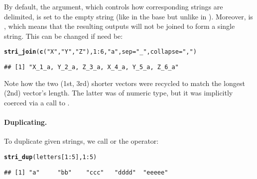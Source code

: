 \documentclass[nojss]{jss}\usepackage[]{graphicx}\usepackage[]{xcolor}
\makeatletter
\newcommand{\hlnum}[1]{\textcolor[rgb]{0.686,0.059,0.569}{#1}}%
\newcommand{\hlstr}[1]{\textcolor[rgb]{0.192,0.494,0.8}{#1}}%
\newcommand{\hlopt}[1]{\textcolor[rgb]{0,0,0}{#1}}%
\newcommand{\hlstd}[1]{\textcolor[rgb]{0.345,0.345,0.345}{#1}}%
\newcommand{\hlkwc}[1]{\textcolor[rgb]{0.333,0.667,0.333}{#1}}%
\newcommand{\hlkwd}[1]{\textcolor[rgb]{0.737,0.353,0.396}{\textbf{#1}}}%
\newenvironment{kframe}{%
 \def\at@end@of@kframe{}%
 \ifinner\ifhmode%
  \def\at@end@of@kframe{\end{minipage}}%
  \begin{minipage}{\columnwidth}%
 \fi\fi%
 \def\FrameCommand##1{\hskip\@totalleftmargin \hskip-\fboxsep
 \colorbox{shadecolor}{##1}\hskip-\fboxsep
     \hskip-\linewidth \hskip-\@totalleftmargin \hskip\columnwidth}%
 \MakeFramed {\advance\hsize-\width
   \@totalleftmargin\z@ \linewidth\hsize
   \@setminipage}}%
 {\par\unskip\endMakeFramed%
 \at@end@of@kframe}
\newenvironment{knitrout}{}{} %
\makeatother
\begin{document}
By default, the  argument, which controls how corresponding
strings are delimited, is set to the empty string
(like in the base  but unlike in ).
Moreover,  is , which means that
the resulting outputs will not be joined to form a single string.
This can be changed if need be:

\begin{knitrout}
\color{fgcolor}\begin{kframe}
\begin{alltt}
\hlkwd{stri_join}\hlstd{(}\hlkwd{c}\hlstd{(}\hlstr{"X"}\hlstd{,} \hlstr{"Y"}\hlstd{,} \hlstr{"Z"}\hlstd{),} \hlnum{1}\hlopt{:}\hlnum{6}\hlstd{,} \hlstr{"a"}\hlstd{,} \hlkwc{sep}\hlstd{=}\hlstr{"_"}\hlstd{,} \hlkwc{collapse}\hlstd{=}\hlstr{", "}\hlstd{)}
\end{alltt}
\begin{verbatim}
## [1] "X_1_a, Y_2_a, Z_3_a, X_4_a, Y_5_a, Z_6_a"
\end{verbatim}
\end{kframe}
\end{knitrout}



\noindent
Note how the two (1st, 3rd) shorter vectors were {recycled} to match
the longest (2nd) vector's length. The latter was of numeric type,
but it was implicitly coerced via a call to .








\paragraph{Duplicating.}
To duplicate given strings, we call
 or the  operator:


\begin{knitrout}
\color{fgcolor}\begin{kframe}
\begin{alltt}
\hlkwd{stri_dup}\hlstd{(letters[}\hlnum{1}\hlopt{:}\hlnum{5}\hlstd{],} \hlnum{1}\hlopt{:}\hlnum{5}\hlstd{)}
\end{alltt}
\begin{verbatim}
## [1] "a"     "bb"    "ccc"   "dddd"  "eeeee"
\end{verbatim}
\end{kframe}
\end{knitrout}
\end{document}
